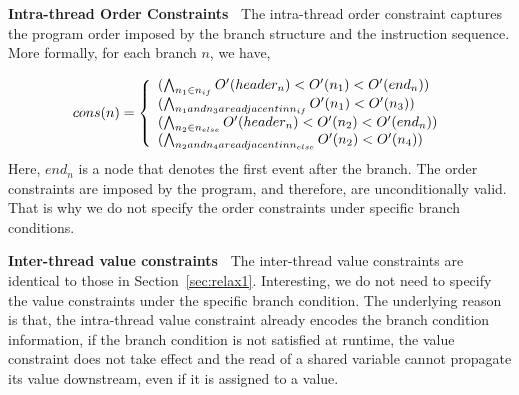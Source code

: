 {\bf Intra-thread Order Constraints\ } The intra-thread order constraint captures the program order imposed by the branch structure and the instruction sequence. More formally, for each branch $n$, we have,

\[ cons(n) = \left\{ 
  \begin{array}{l l}
  (\bigwedge_{n_1\in n_{if}}{O'(header_n)<O'(n_1)<O'(end_n)}) \\
   (\bigwedge_{n_1 and n_3 are adjacent in n_{if}}{O'(n_1)<O'(n_3)}) \\
   (\bigwedge_{n_2\in n_{else}}{O'(header_n)<O'(n_2)<O'(end_n)}) \\
    (\bigwedge_{n_2 and n_4 are adjacent in n_{else}}{O'(n_2)<O'(n_4)}) \\
  \end{array} \right.\]
Here, $end_n$ is a node that denotes the first event after the branch.  The order constraints are imposed by the program, and therefore, are unconditionally valid. That is why we do not specify the order constraints under specific branch conditions. 

{\bf Inter-thread value constraints\ } The inter-thread value constraints are identical to those in Section~\ref{sec:relax1}. Interesting, we do not need to specify the value constraints under the specific branch condition. The underlying reason is that, the intra-thread value constraint already encodes the branch condition information, if the branch condition is not satisfied at runtime, the value constraint does not take effect and the read of a shared variable cannot propagate its value downstream, even if it is assigned to a value. 





